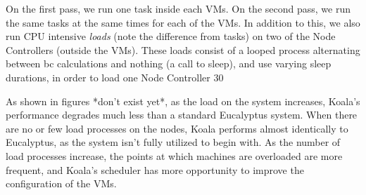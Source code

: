 On the first pass, we run one task inside each VMs.  On the second pass, we run the same tasks at the same times for each of the VMs.  In addition to this, we also run CPU intensive \emph{loads} (note the difference from tasks) on two of the Node Controllers (outside the VMs).  These loads consist of a looped process alternating between bc calculations and nothing (a call to sleep), and use varying sleep durations, in order to load one Node Controller 30%

As shown in figures *don't exist yet*, as the load on the system increases, Koala's performance degrades much less than a standard Eucalyptus system.  When there are no or few load processes on the nodes, Koala performs almost identically to Eucalyptus, as the system isn't fully utilized to begin with.  As the number of load processes increase, the points at which machines are overloaded are more frequent, and Koala's scheduler has more opportunity to improve the configuration of the VMs.
